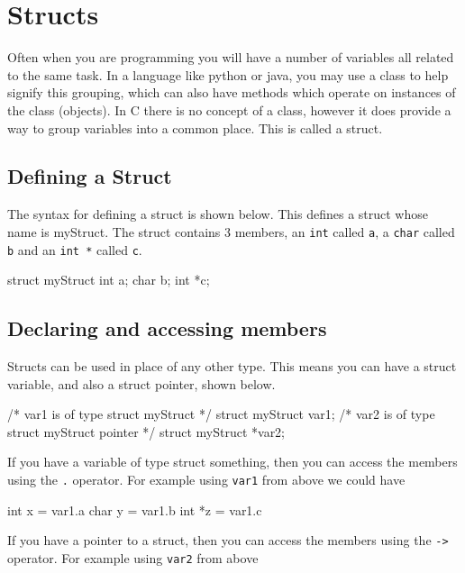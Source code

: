 
\chapter{Structs}



Often when you are programming you will have a number of variables all related to the same task.
In a language like python or java, you may use a class to help signify this grouping, which can also have methods which operate on instances of the class (objects).
In C there is no concept of a class, however it does provide a way to group variables into a common place.
This is called a struct.

\section{Defining a Struct}

The syntax for defining a struct is shown below.
This defines a struct whose name is myStruct.
The struct contains 3 members, an \texttt{int} called \texttt{a}, a \texttt{char} called \texttt{b} and an \texttt{int *} called \texttt{c}.

\begin{codeblock}
struct myStruct {
    int a;
    char b;
    int *c;
}
\end{codeblock}

\section{Declaring and accessing members}

Structs can be used in place of any other type.
This means you can have a struct variable, and also a struct pointer, shown below.

\begin{codeblock}
/* var1 is of type struct myStruct */
struct myStruct var1; 
/* var2 is of type struct myStruct pointer */
struct myStruct *var2; 
\end{codeblock}

If you have a variable of type struct something, then you can access the members using the \texttt{.} operator.
For example using \texttt{var1} from above we could have

\begin{codeblock}
int x = var1.a
char y = var1.b
int *z = var1.c
\end{codeblock}

If you have a pointer to a struct, then you can access the members using the \texttt{->} operator.
For example using \texttt{var2} from above

